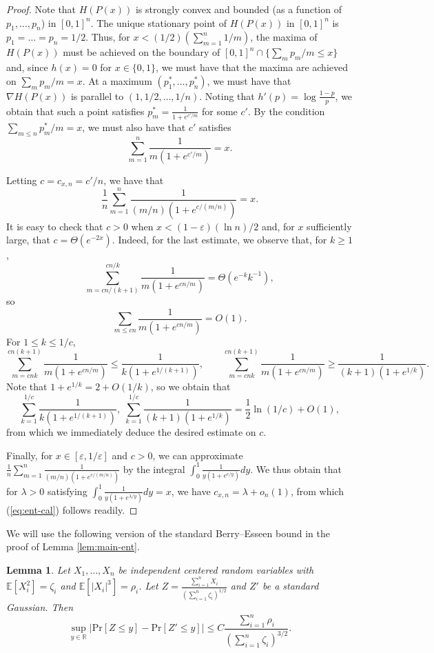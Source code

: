 \documentclass{daj}
\newtheorem{lemma}{Lemma}
\newcommand{\eps}{\varepsilon}
\newcommand{\pr}{\mathrm{Pr}}
\begin{document}
\begin{proof}
    Note that $H(P(x))$ is strongly convex and bounded (as a function of $p_1,\dots,p_n$) in $[0,1]^n$. The unique stationary point of $H(P(x))$ in $[0,1]^n$ is $p_1=\dots=p_n=1/2$. Thus, for $x<(1/2)(\sum_{m=1}^{n}1/m)$, the maxima of $H(P(x))$ must be achieved on the boundary of $[0,1]^n \cap \{\sum_m p_m/m \le x\}$ and, since $h(x)=0$ for $x\in \{0,1\}$, we must have that the maxima are achieved on $\sum_m p_m/m = x$. At a maximum $(p_1^*,\dots,p_n^*)$, we must have that $\nabla H(P(x))$ is parallel to $(1,1/2,\dots,1/n)$. Noting that $h'(p) = \log \frac{1-p}{p}$, we obtain that such a point satisfies $p_m^* = \frac{1}{1+e^{c'/m}}$ for some $c'$. By the condition $\sum_{m\le n}p_m^*/m=x$, we must also have that $c'$ satisfies 
    \[
        \sum_{m=1}^{n} \frac{1}{m(1+e^{c'/m})}=x.
    \]
    
    
    Letting $c = c_{x,n} = c'/n$, we have that 
    \[
        \frac{1}{n} \sum_{m=1}^{n} \frac{1}{(m/n)(1+e^{c/(m/n)})} = x.
    \]
    It is easy to check that $c > 0$ when $x < (1-\eps)(\ln n)/2$ and, for $x$ sufficiently large, that $c = \Theta(e^{-2x})$. Indeed, for the last estimate, we observe that, for $k \ge 1$,   
    \[
        \sum_{m=cn/(k+1)}^{cn/k} \frac{1}{m(1+e^{cn/m})} = \Theta(e^{-k}k^{-1}),
    \]
    so \[
    \sum_{m\le cn} \frac{1}{m(1+e^{cn/m})} = O(1).
    \]
    For 
    $1 \le k \le 1/c$, 
    \[
    \sum_{m=cnk}^{cn(k+1)} \frac{1}{m(1+e^{cn/m})} \le \frac{1}{k(1+e^{1/(k+1)})}, \qquad \sum_{m=cnk}^{cn(k+1)} \frac{1}{m(1+e^{cn/m})} \ge \frac{1}{(k+1)(1+e^{1/k})}.
    \]
    Note that $1+e^{1/k} = 2 + O(1/k)$, so we obtain that \[
    \sum_{k= 1}^{1/c} \frac{1}{k(1+e^{1/(k+1)})}, \; \sum_{k=1}^{1/c}\frac{1}{(k+1)(1+e^{1/k})} = \frac{1}{2}\ln (1/c) + O(1),
    \]
    from which we immediately deduce the desired estimate on $c$. 
    
    Finally, for $x\in [\eps,1/\eps]$ and $c>0$, we can approximate $\frac{1}{n} \sum_{m=1}^{n} \frac{1}{(m/n)(1+e^{c/(m/n)})}$ by the integral $\int_{0}^{1} \frac{1}{y(1+e^{c/y})}dy$. We thus obtain that for $\lambda>0$ satisfying $\int_{0}^{1} \frac{1}{y(1+e^{\lambda/y})} dy = x$, we have $c_{x,n} = \lambda+o_n(1)$, from which (\ref{eq:ent-cal}) follows readily. 
\end{proof}




We will use the following version of the standard Berry--Esseen bound \cite{B, E, S} in the proof of Lemma \ref{lem:main-ent}. 

\begin{lemma}\label{lem:B-E}
    Let $X_1,\dots,X_n$ be independent centered random variables with $\mathbb{E}[X_i^2] = \zeta_i$ and $\mathbb{E}[|X_i|^3] = \rho_i$. Let $Z = \frac{\sum_{i=1}^{n}X_i}{(\sum_{i=1}^{n}\zeta_i)^{1/2}}$ and $Z'$ be a standard Gaussian. Then 
    \[
        \sup_{y\in \mathbb{R}} |\pr[Z \le y] - \pr[Z' \le y]| \le C\frac{\sum_{i=1}^{n}\rho_i}{(\sum_{i=1}^{n}\zeta_i)^{3/2}}.
    \]
\end{lemma}
\end{document}
